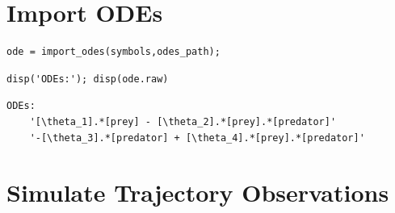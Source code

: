 \section{Import ODEs}

\color{RoyalPurple}\begin{verbatim}
ode = import_odes(symbols,odes_path);
\end{verbatim}
\color{black}
\color{RoyalPurple}\begin{verbatim}
disp('ODEs:'); disp(ode.raw)
\end{verbatim}
\color{black}

        \begin{verbatim}ODEs:
    '[\theta_1].*[prey] - [\theta_2].*[prey].*[predator]'
    '-[\theta_3].*[predator] + [\theta_4].*[prey].*[predator]'

\end{verbatim}
\color{black}

\section{Simulate Trajectory Observations}

